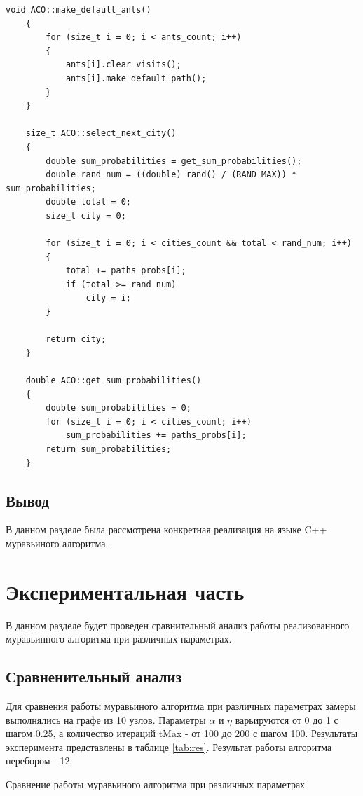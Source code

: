 \documentclass[12pt, a4paper]{report}
\begin{document}
\begin{lstlisting}[label=code_aco_meth,caption=Основные функции муравьиного алгоритма]
    void ACO::make_default_ants()
    {
	    for (size_t i = 0; i < ants_count; i++)
	    {
	    	ants[i].clear_visits();
	    	ants[i].make_default_path();
	    }
    }
    
    size_t ACO::select_next_city()
    {
	    double sum_probabilities = get_sum_probabilities();
	    double rand_num = ((double) rand() / (RAND_MAX)) * sum_probabilities;
	    double total = 0;
	    size_t city = 0;
	    
	    for (size_t i = 0; i < cities_count && total < rand_num; i++)
	    {
	    	total += paths_probs[i];
	    	if (total >= rand_num)
	    		city = i;
	    }
	    
	    return city;
    }
    
    double ACO::get_sum_probabilities()
    {
	    double sum_probabilities = 0;
	    for (size_t i = 0; i < cities_count; i++)
	    	sum_probabilities += paths_probs[i];
	    return sum_probabilities;
    }
    \end{lstlisting}
    
    \section{Вывод}
    
    В данном разделе была рассмотрена конкретная реализация на языке C++ муравьиного алгоритма.
    
    \chapter{Экспериментальная часть}
    
    В данном разделе будет проведен сравнительный анализ работы реализованного муравьинного алгоритма при различных параметрах.
    
    \section {Сравненительный анализ}
    
    Для сравнения работы муравьиного алгоритма при различных параметрах замеры выполнялись на графе из 10 узлов. Параметры $\alpha$ и $\eta$ варьируются от 0 до 1 с шагом 0.25, а количество итераций tMax - от 100 до 200 с шагом 100. Результаты эксперимента представлены в таблице \ref{tab:res}. Результат работы алгоритма перебором - 12.

	\begin{table}[ht!]
		\caption{Сравнение работы муравьиного алгоритма при различных параметрах}
		\label{tab:res}
		\begin{center}
		\end{center}
	\end{table}
    
\end{document}
